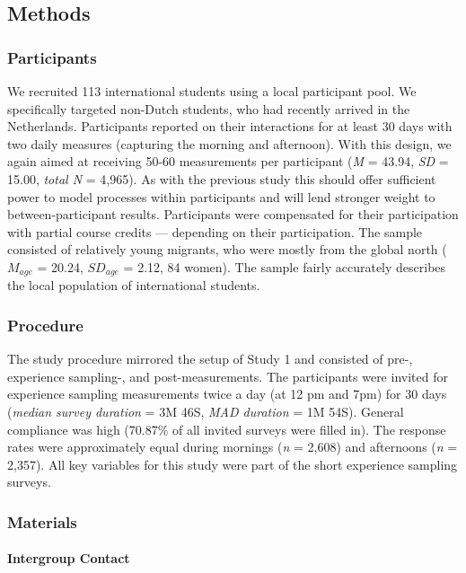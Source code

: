 \subsection{Methods}

\subsubsection{Participants}

We recruited 113 international students using a local participant pool.
We specifically targeted non-Dutch students, who had recently arrived in
the Netherlands. Participants reported on their interactions for at
least 30 days with two daily measures (capturing the morning and
afternoon). With this design, we again aimed at receiving 50-60
measurements per participant (\textit{M} = 43.94, \textit{SD} = 15.00,
\textit{total N} = 4,965). As with the previous study this should offer
sufficient power to model processes within participants and will lend
stronger weight to between-participant results. Participants were
compensated for their participation with partial course credits ---
depending on their participation. The sample consisted of relatively
young migrants, who were mostly from the global north (\(M_{age}\) =
20.24, \(SD_{age}\) = 2.12, 84 women). The sample fairly accurately
describes the local population of international students.

\subsubsection{Procedure}

The study procedure mirrored the setup of Study 1 and consisted of pre-,
experience sampling-, and post-measurements. The participants were
invited for experience sampling measurements twice a day (at 12 pm and
7pm) for 30 days (\textit{median survey duration} = 3M 46S,
\textit{MAD duration} = 1M 54S). General compliance was high (70.87\% of
all invited surveys were filled in). The response rates were
approximately equal during mornings (\textit{n} = 2,608) and afternoons
(\textit{n} = 2,357). All key variables for this study were part of the
short experience sampling surveys.

\subsubsection{Materials}

\paragraph{Intergroup Contact}

